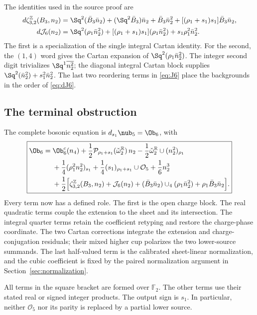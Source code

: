 The identities used in the source proof are
\begin{align}
 d\zeta^{\mathbb Z}_{3,2}(B_3,n_2)
 &=\Sq^2(\bar B_3\bar n_2)
 +(\Sq^2\bar B_3)\bar n_2+\bar B_3\bar n_2^2
 +[(\rho_1+s_1)s_1]\bar B_3\bar n_2,
 \label{eq:dH6}\\
 d\mathcal J_6(n_2)
 &=\Sq^2(\rho_1\bar n_2^2)
 +[(\rho_1+s_1)s_1](\rho_1\bar n_2^2)
 +s_1\rho_1^2\bar n_2^2.
 \label{eq:dJ6}
\end{align}
The first is a specialization of the single integral Cartan identity. For the second, the $(1,4)$ word gives the Cartan expansion of $\Sq^2(\rho_1\bar n_2^2)$. The integer second digit trivializes $\Sq^1\overline{n_2^2}$; the diagonal integral Cartan block supplies $\Sq^2(\bar n_2^2)+s_1^2\bar n_2^2$. The last two reordering terms in \eqref{eq:J6} place the backgrounds in the order of \eqref{eq:dJ6}.

\subsection{The terminal obstruction}\label{subsec:parent}
The complete bosonic equation is $d_{s_1}\nub_5=\Ob_6$, with
\begin{equation}\label{eq:4d-O6}
 \boxed{\begin{aligned}
 \Ob_6={}&\Ob^c_6(n_4)
 +\frac12\mathcal P_{\rho_1+s_1}(\check\omega_2^{\mathbb R})\,n_2
 -\frac12\check\omega_2^{\mathbb R}\cup(n_2^2)_{\rho_1}\\
 &+\frac14(\rho_1^2 n_2^2)_{s_1}
 +\frac14(s_1)_{\rho_1+s_1}\cup\mathcal O_5
 +\frac16 n_2^3\\
 &+\frac12\Big[
   \zeta^{\mathbb Z}_{3,2}(B_3,n_2)+\mathcal J_6(n_2)
   +(\bar B_3\bar n_2)\cup_4(\rho_1\bar n_2^2)
   +\rho_1\bar B_3\bar n_2\Big].
 \end{aligned}}
\end{equation}
Every term now has a defined role. The first is the open charge block. The real quadratic terms couple the extension to the sheet and its intersection. The integral quarter terms retain the coefficient retyping and restore the charge-phase coordinate. The two Cartan corrections integrate the extension and charge-conjugation residuals; their mixed higher cup polarizes the two lower-source summands. The last half-valued term is the calibrated sheet-linear normalization, and the cubic coefficient is fixed by the paired normalization argument in Section~\ref{sec:normalization}.

All terms in the square bracket are formed over $\mathbb F_2$. The other terms use their stated real or signed integer products. The output sign is $s_1$. In particular, neither $\mathcal O_5$ nor its parity is replaced by a partial lower source.

